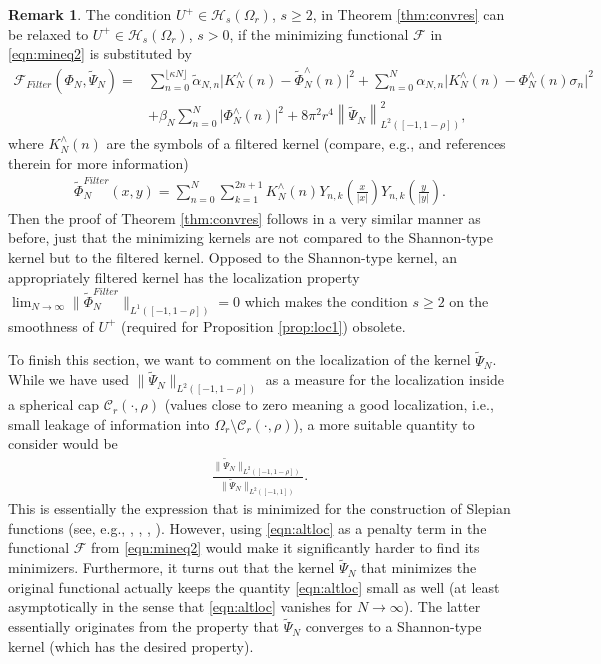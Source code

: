 \documentclass[a4paper, 10pt]{article}
\numberwithin{equation}{section}
\theoremstyle{definition}
\newtheorem{rem}[thm]{Remark}
\begin{document}
\begin{rem}\label{rem:lockernels}
The condition $U^+\in \mathcal{H}_s(\Omega_r)$, $s\geq 2$, in Theorem \ref{thm:convres} can be relaxed to $U^+\in \mathcal{H}_s(\Omega_r)$, $s>0$, if the minimizing functional $\mathcal{F}$ in \eqref{eqn:mineq2} is substituted by
\begin{align}\label{eqn:mineq3}
\mathcal{F}_{Filter}(\Phi_N,\tilde{\Psi}_N)=&\sum_{n=0}^{\lfloor \kappa N\rfloor}\tilde{\alpha}_{N,n}\big|K_N^\wedge(n)-\tilde{\Phi}_{N}^\wedge(n)\big|^2+\sum_{n=0}^{N}\alpha_{N,n}\big|K_N^\wedge(n)-{\Phi}_{N}^\wedge(n)\sigma_n\big|^2
\\&+\beta_N\sum_{n=0}^{N}\big|\Phi_N^\wedge(n)\big|^2+8\pi^2 r^4\left\|\tilde{\Psi}_N\right\|^2_{L^2([-1,1-\rho])},\nonumber
\end{align}
where $K_N^\wedge(n)$ are the symbols of a filtered kernel (compare, e.g., \cite{yuguang132} and references therein for more information)
\begin{align}
\tilde{\Phi}_{N}^{Filter}(x,y)=\sum_{n=0}^{N}\sum_{k=1}^{2n+1}K_N^\wedge(n)Y_{n,k}\left(\frac{x}{|x|}\right)Y_{n,k}\left(\frac{y}{|y|}\right).
\end{align}
Then the proof of Theorem \ref{thm:convres} follows in a very similar manner as before, just that the minimizing kernels are not compared to the Shannon-type kernel but to the filtered kernel. Opposed to the Shannon-type kernel, an appropriately filtered kernel has the localization property $\lim_{N\to\infty}\|\tilde{\Phi}_{N}^{Filter}\|_{L^1([-1,1-\rho])}=0$  which makes the condition $s\geq 2$ on the smoothness of $U^+$ (required for Proposition \ref{prop:loc1}) obsolete. 
\end{rem}

To finish this section, we want to comment on the localization of the kernel $\tilde{\Psi}_N$. While we have used $\|\tilde{\Psi}_N\|_{L^2([-1,1-\rho])}$ as a measure for the localization inside a spherical cap $\mathcal{C}_r(\cdot,\rho)$ (values close to zero meaning a good localization, i.e., small leakage of information into $\Omega_r\setminus\mathcal{C}_r(\cdot,\rho)$), a more suitable quantity to consider would be
\begin{align}\label{eqn:altloc}
\frac{\big\|\tilde{\Psi}_N\big\|_{L^2([-1,1-\rho])}}{\big\|\tilde{\Psi}_N\big\|_{L^2([-1,1])}}.
\end{align}
This is essentially the expression that is minimized for the construction of Slepian functions (see, e.g., \cite{plattner13}, \cite{plattner13b}, \cite{simons06}, \cite{simons10}). However, using \eqref{eqn:altloc} as a penalty term in the functional $\mathcal{F}$ from \eqref{eqn:mineq2} would make it significantly harder to find its minimizers. Furthermore, it turns out that the kernel $\tilde{\Psi}_N$ that minimizes the original functional actually keeps the quantity \eqref{eqn:altloc} small as well (at least asymptotically in the sense that \eqref{eqn:altloc} vanishes for $N\to\infty$). The latter essentially originates from the property that $\tilde{\Psi}_N$ converges to a Shannon-type kernel (which has the desired property).
\end{document}
